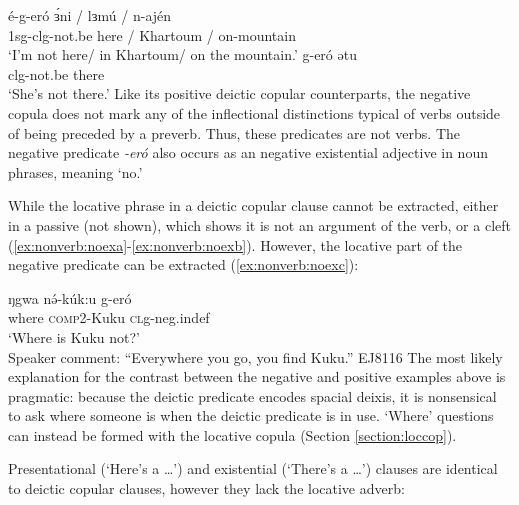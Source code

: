 \ea 
	\ea \gll	é-g-eró			ɜ́ni	/ lɜmú / n-ajén \\									
				1sg-clg-not.be	here / Khartoum / on-mountain \\			
		\glt 	‘I’m not here/ in Khartoum/ on the mountain.’
	\ex \gll 	g-eró			ətu			\\							
				clg-not.be		there		\\
		\glt	‘She’s not there.’
\z 
\z 
Like its positive deictic copular counterparts, the negative copula does not mark any of the inflectional distinctions typical of verbs outside of being preceded by a preverb. Thus, these predicates are not verbs. The negative predicate \textit{-eró} also occurs as an negative existential adjective in noun phrases, meaning `no.'

While the locative phrase in a deictic copular clause cannot be extracted, either in a passive (not shown), which shows it is not an argument of the verb, or a cleft (\ref{ex:nonverb:noexa}-\ref{ex:nonverb:noexb}). However, the locative part of the negative predicate can be extracted (\ref{ex:nonverb:noexc}):

\ea 
		 \label{ex:nonverb:noexa}
			\label{ex:nonverb:noexa}
	\ex  \gll	ŋgwa		nə́-kúk:u	 	g-eró	 \\
		where		\textsc{comp2}-Kuku	\textsc{cl}g-neg.indef\\
		\glt `Where is Kuku not?’\\
	Speaker comment: ``Everywhere you go, you find Kuku.'' \hfill EJ8116
 \label{ex:nonverb:noexc} \z  
\z 
The most likely explanation for the contrast between the negative and positive examples above is pragmatic: because the deictic predicate encodes spacial deixis, it is nonsensical to ask where someone is when the deictic predicate is in use. `Where' questions can instead be formed with the locative copula (Section \ref{section:loccop}).
	

Presentational (`Here's a \ldots') and existential (`There's a \ldots') clauses are identical to deictic copular clauses, however they lack the locative adverb:


